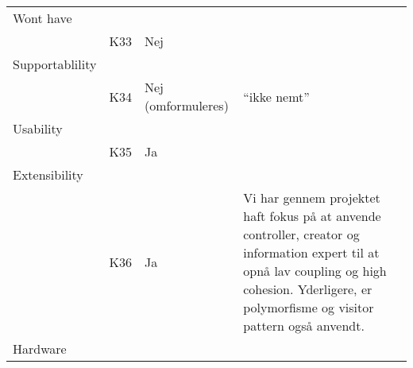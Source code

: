 \documentclass[class=article, crop=false]{standalone}
\begin{document}
\begin{table}[]
\begin{tabular}{llll}
            Wont have       &                &                    &                                                                                                                                                                                                    \\
            & K33            & Nej                &                                                                                                                                                                                                    \\
            Supportablility &                &                    &                                                                                                                                                                                                    \\
            & K34            & Nej (omformuleres) & “ikke nemt”                                                                                                                                                                                        \\
            Usability       &                &                    &                                                                                                                                                                                                    \\
            & K35            & Ja                 &                                                                                                                                                                                                    \\
            Extensibility   &                &                    &                                                                                                                                                                                                    \\
            & K36            & Ja                 & Vi har gennem projektet haft fokus på at anvende controller, creator og information expert til at opnå lav coupling og high cohesion. Yderligere, er polymorfisme og visitor pattern også anvendt. \\
            Hardware        &                &                    &                                                                                                                                                                                                    \\

\end{tabular}
\end{table}
\end{document}
